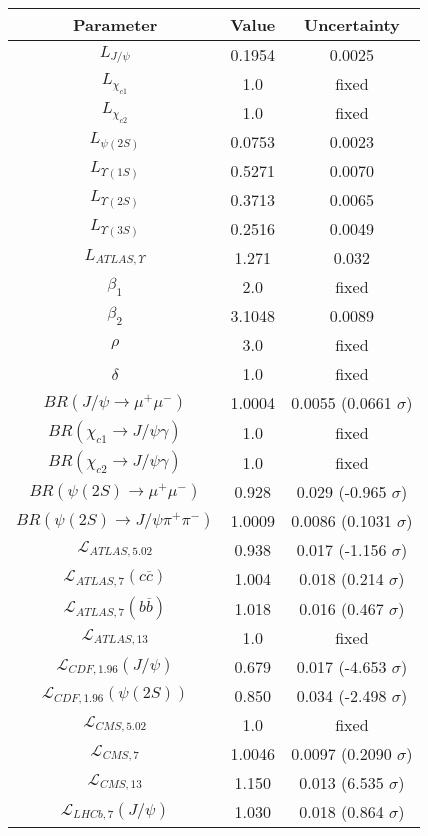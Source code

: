 \begin{table}[h!]
\centering
\begin{tabular}{c|c|c}
Parameter & Value & Uncertainty \\
\hline
$L_{J/\psi}$ & 0.1954 & 0.0025 \\
$L_{\chi_{c1}}$ & 1.0 & fixed \\
$L_{\chi_{c2}}$ & 1.0 & fixed \\
$L_{\psi(2S)}$ & 0.0753 & 0.0023 \\
$L_{\Upsilon(1S)}$ & 0.5271 & 0.0070 \\
$L_{\Upsilon(2S)}$ & 0.3713 & 0.0065 \\
$L_{\Upsilon(3S)}$ & 0.2516 & 0.0049 \\
$L_{ATLAS,\Upsilon}$ & 1.271 & 0.032 \\
$\beta_1$ & 2.0 & fixed \\
$\beta_2$ & 3.1048 & 0.0089 \\
$\rho$ & 3.0 & fixed \\
$\delta$ & 1.0 & fixed \\
$BR(J/\psi\rightarrow\mu^+\mu^-)$ & 1.0004 & 0.0055 (0.0661 $\sigma$) \\
$BR(\chi_{c1}\rightarrow J/\psi\gamma)$ & 1.0 & fixed \\
$BR(\chi_{c2}\rightarrow J/\psi\gamma)$ & 1.0 & fixed \\
$BR(\psi(2S)\rightarrow\mu^+\mu^-)$ & 0.928 & 0.029 (-0.965 $\sigma$) \\
$BR(\psi(2S)\rightarrow J/\psi\pi^+\pi^-)$ & 1.0009 & 0.0086 (0.1031 $\sigma$) \\
$\mathcal L_{ATLAS,5.02}$ & 0.938 & 0.017 (-1.156 $\sigma$) \\
$\mathcal L_{ATLAS,7}(c\overline c)$ & 1.004 & 0.018 (0.214 $\sigma$) \\
$\mathcal L_{ATLAS,7}(b\overline b)$ & 1.018 & 0.016 (0.467 $\sigma$) \\
$\mathcal L_{ATLAS,13}$ & 1.0 & fixed \\
$\mathcal L_{CDF,1.96}(J/\psi)$ & 0.679 & 0.017 (-4.653 $\sigma$) \\
$\mathcal L_{CDF,1.96}(\psi(2S))$ & 0.850 & 0.034 (-2.498 $\sigma$) \\
$\mathcal L_{CMS,5.02}$ & 1.0 & fixed \\
$\mathcal L_{CMS,7}$ & 1.0046 & 0.0097 (0.2090 $\sigma$) \\
$\mathcal L_{CMS,13}$ & 1.150 & 0.013 (6.535 $\sigma$) \\
$\mathcal L_{LHCb,7}(J/\psi)$ & 1.030 & 0.018 (0.864 $\sigma$) \\

\end{tabular}
\end{table}
